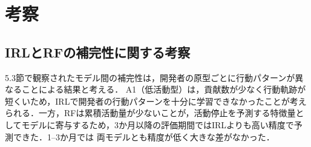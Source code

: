 \documentclass[submit,noauthor,ses,dvipdfmx]{ipsj}
\begin{document}





\section{考察}\label{sec:discuss}

\subsection{IRLとRFの補完性に関する考察}
5.3節で観察されたモデル間の補完性は，開発者の原型ごとに行動パターンが異なることによる結果と考える．
A1（低活動型）は，貢献数が少なく行動軌跡が短くいため，IRLで開発者の行動パターンを十分に学習できなかったことが考えられる．一方，RFは累積活動量が少ないことが，活動停止を予測する特徴量としてモデルに寄与するため，3か月以降の評価期間ではIRLよりも高い精度で予測できた．1--3か月では
両モデルとも精度が低く大きな差がなかった．
\end{document}
